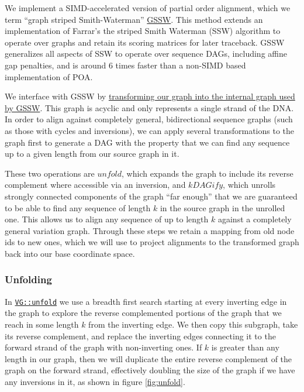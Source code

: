 \documentclass{article}
\begin{document}
We implement a SIMD-accelerated version of partial order alignment, which we term ``graph striped Smith-Waterman'' \href{https://github.com/ekg/gssw}{GSSW}.
This method extends an implementation \cite{zhao2013} of Farrar's the striped Smith Waterman (SSW) algorithm \cite{farrar2007} to operate over graphs and retain its scoring matrices for later traceback.
GSSW generalizes all aspects of SSW to operate over sequence DAGs, including affine gap penalties, and is around 6 times faster than a non-SIMD based implementation of POA.

We interface with GSSW by \href{https://github.com/vgteam/vg/blob/fbcb6e62/src/vg.cpp#L6461-L6532}{transforming our graph into the internal graph used by GSSW}.
This graph is acyclic and only represents a single strand of the DNA.
In order to align against completely general, bidirectional sequence graphs (such as those with cycles and inversions), we can apply several transformations to the graph first to generate a DAG with the property that we can find any sequence up to a given length from our source graph in it.

These two operations are $unfold$, which expands the graph to include its reverse complement where accessible via an inversion, and $kDAGify$, which unrolls strongly connected components of the graph ``far enough'' that we are guaranteed to be able to find any sequence of length $k$ in the source graph in the unrolled one.
This allows us to align any sequence of up to length $k$ against a completely general variation graph.
Through these steps we retain a mapping from old node ids to new ones, which we will use to project alignments to the transformed graph back into our base coordinate space.

\subsubsection{Unfolding}

In \href{https://github.com/vgteam/vg/blob/fbcb6e62/src/vg.cpp#L8289-L8400}{{\tt VG::unfold}} we use a breadth first search starting at every inverting edge in the graph to explore the reverse complemented portions of the graph that we reach in some length $k$ from the inverting edge.
We then copy this subgraph, take its reverse complement, and replace the inverting edges connecting it to the forward strand of the graph with non-inverting ones.
If $k$ is greater than any length in our graph, then we will duplicate the entire reverse complement of the graph on the forward strand, effectively doubling the size of the graph if we have any inversions in it, as shown in figure \ref{fig:unfold}.
\end{document}
